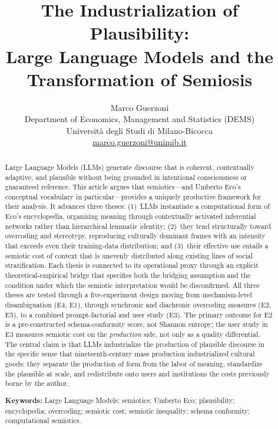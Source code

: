 \documentclass[12pt,a4paper]{article}
\title{\textbf{The Industrialization of Plausibility:\\Large Language Models and the Transformation of Semiosis}}
\author{Marco Guerzoni\\[4pt]
\small Department of Economics, Management and Statistics (DEMS)\\
\small Universit\`a degli Studi di Milano-Bicocca\\
\small \url{marco.guerzoni@unimib.it}}
\date{}
\begin{document}
\maketitle

\begin{abstract}
Large Language Models (LLMs) generate discourse that is coherent, contextually
adaptive, and plausible without being grounded in intentional consciousness or
guaranteed reference. This article argues that semiotics---and Umberto Eco's
conceptual vocabulary in particular---provides a uniquely productive framework
for their analysis. It advances three theses: (1)~LLMs instantiate a
computational form of Eco's encyclopedia, organizing meaning through
contextually activated inferential networks rather than hierarchical lemmatic
identity; (2)~they tend structurally toward overcoding and stereotypy,
reproducing culturally dominant frames with an intensity that exceeds even
their training-data distribution; and (3)~their effective use entails a
semiotic cost of context that is unevenly distributed along existing lines of
social stratification. Each thesis is connected to its operational proxy
through an explicit theoretical-empirical bridge that specifies both the
bridging assumption and the condition under which the semiotic interpretation
would be disconfirmed. All three theses are tested through a five-experiment
design moving from mechanism-level disambiguation (E4, E1), through
synchronic and diachronic overcoding measures (E2, E5), to a combined
prompt-factorial and user study (E3). The primary outcome for E2 is a
pre-constructed schema-conformity score, not Shannon entropy; the user study
in E3 measures semiotic cost on the \emph{production} side, not only as a
quality differential. The central claim is that LLMs industrialize the
production of plausible discourse in the specific sense that nineteenth-century
mass production industrialized cultural goods: they separate the production
of form from the labor of meaning, standardize the plausible at scale, and
redistribute onto users and institutions the costs previously borne by the
author.

\smallskip
\noindent\textbf{Keywords:} Large Language Models; semiotics; Umberto Eco;
plausibility; encyclopedia; overcoding; semiotic cost; semiotic inequality;
schema conformity; computational semiotics.
\end{abstract}

\bigskip

\end{document}
